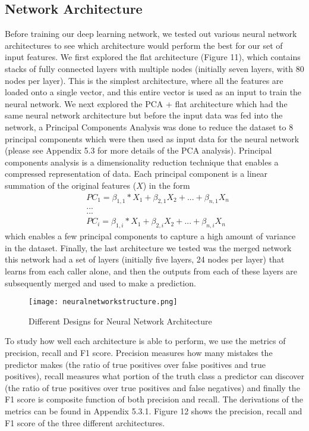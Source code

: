 \documentclass{article}
\begin{document}
\subsection{Network Architecture}
Before training our deep learning network, we tested out various neural network architectures to see which architecture would perform the best for our set of input features. We first explored the flat architecture (Figure 11), which contains stacks of fully connected layers with multiple nodes (initially seven layers, with 80 nodes per layer). This is the simplest architecture, where all the features are loaded onto a single vector, and this entire vector is used as an input to train the neural network. We next explored the PCA + flat architecture which had the same neural network architecture but before the input data was fed into the network, a Principal Components Analysis was done to reduce the dataset to 8 principal components which were then used as input data for the neural network (please see Appendix 5.3 for more details of the PCA analysis). Principal components analysis is a dimensionality reduction technique that enables a compressed representation of data. Each principal component is a linear summation of the original features ($X$) in the form 
\begin{align*}
&PC_1 = \beta_{1,1}*X_{1} + \beta_{2,1} X_{2} +... + \beta_{n,1} X_n \\
&... \\
&... \\
&PC_i = \beta_{1,i}*X_{1} + \beta_{2,i} X_{2} +... + \beta_{n,i} X_n
\end{align*}
which enables a few principal components to capture a high amount of variance in the dataset.
Finally, the last architecture we tested was the merged network this network had a set of layers (initially five layers, 24 nodes per layer) that learns from each caller alone, and then the outputs from each of these layers are subsequently merged and used to make a prediction. 
\begin{figure}[H]
\texttt{[image: neuralnetworkstructure.png]}
\centering
\caption{Different Designs for Neural Network Architecture}
\end{figure}
To study how well each architecture is able to perform, we use the metrics of precision, recall and F1 score. Precision measures how many mistakes the predictor makes (the ratio of true positives over false positives and true positives), recall measures what portion of the truth class a predictor can discover (the ratio of true positives over true positives and false negatives) and finally the F1 score is composite function of both precision and recall. The derivations of the metrics can be found in Appendix 5.3.1. Figure 12 shows the precision, recall and F1 score of the three different architectures.
\end{document}

